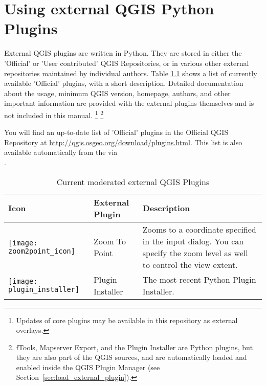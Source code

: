 
\chapter{Using external QGIS Python Plugins}\label{sec:external_plugins}


External QGIS plugins are written in Python. They are stored in either
the 'Official' or 'User contributed' QGIS Repositories, or in various other external
repositories maintained by individual authors.
Table \ref{tab:external_plugins} shows a list of currently available 'Official'
plugins, with a short description.
Detailed documentation about the usage, minimum QGIS version, homepage, authors,
and other important information are provided with the external plugins themselves
and is not included in this manual.
\footnote{Updates of core plugins may be
available in this repository as external overlays.}
\footnote{fTools, Mapserver Export, and the Plugin Installer are Python plugins,
but they are also part of the QGIS sources, and are automatically loaded and
enabled inside the QGIS Plugin Manager (see Section~\ref{sec:load_external_plugin}).}


You will find an up-to-date list of 'Official' plugins in the Official QGIS
Repository at \url{http://qgis.osgeo.org/download/plugins.html}. This list is
also available automatically from the 
via \\
.

\begin{table}[H]
\centering
 \begin{tabular}{|l|l|p{8cm}|}
\hline \textbf{Icon} & \textbf{External Plugin} & \textbf{Description}\\
\hline
\texttt{[image: zoom2point\_icon]}
 & Zoom To Point \index{plugins!Zoom To Point} & Zooms to a coordinate
  specified in the input dialog. You can specify the zoom level as well to
  control the view extent.\\
\hline
\texttt{[image: plugin\_installer]}
 & Plugin Installer \index{plugins!Plugin Installer} & The most recent Python Plugin Installer.\\
\hline
\end{tabular}
\caption{Current moderated external QGIS Plugins}\label{tab:external_plugins}
\end{table}

